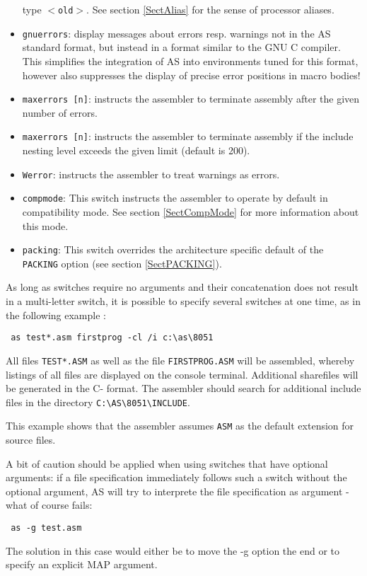 \documentclass[12pt,twoside]{report}
\newcommand{\tty}[1]{{\tt #1}}
\newcommand{\asname}{{AS}}
\begin{document}
\begin{itemize}
{      type \tty{$<$old$>$}.  See section \ref{SectAlias} for the sense of
      processor aliases.}
\item{{\tt gnuerrors}: display messages about errors resp. warnings not
      in the \asname{} standard format, but instead in a format similar to the
      GNU C compiler.  This simplifies the integration of \asname{} into
      environments tuned for this format, however also suppresses the
      display of precise error positions in macro bodies!}
\item{{\tt maxerrors [n]}: instructs the assembler to terminate
      assembly after the given number of errors.}
\item{{\tt maxerrors [n]}: instructs the assembler to terminate
      assembly if the include nesting level exceeds the given limit
      (default is 200).}
\item{{\tt Werror}: instructs the assembler to treat warnings as errors.}
\item{\tty{compmode}: This switch instructs the assembler to operate by
      default in compatibility mode.  See section \ref{SectCompMode} for
      more information about this mode.}
\item{\tty{packing}: This switch overrides the architecture specific
      default of the {\tt PACKING} option (see section \ref{SectPACKING}).}
\end{itemize}
As long as switches require no arguments and their concatenation does
not result in a multi-letter switch, it is possible to specify several
switches at one time, as in the following example :
\begin{verbatim}
 as test*.asm firstprog -cl /i c:\as\8051
\end{verbatim}
All files \tty{TEST*.ASM} as well as the file \tty{FIRSTPROG.ASM} will be
assembled, whereby listings of all files are displayed on the
console terminal.  Additional sharefiles will be generated in the C-
format.  The assembler should search for additional include files
in the directory \verb!C:\AS\8051\INCLUDE!.

This example shows that the assembler assumes \tty{ASM} as the default
extension for source files.

A bit of caution should be applied when using switches that have
optional arguments: if a file specification immediately follows such
a switch without the optional argument, \asname{} will try to interprete the
file specification as argument - what of course fails:
\begin{verbatim}
 as -g test.asm
\end{verbatim}
The solution in this case would either be to move the -g option the
end or to specify an explicit MAP argument.
\end{document}
